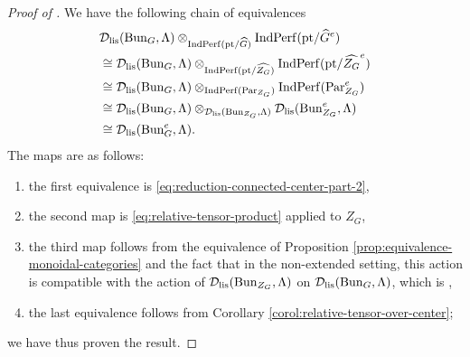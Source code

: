 \begin{proof}[Proof of ]
    We have the following chain of equivalences 
    \begin{align*}
        &\mathcal{D}_{\textnormal{lis}}(\mathrm{Bun}_{G},\Lambda) \otimes_{\mathrm{Ind}\mathrm{Perf}(\mathrm{pt}/\widehat{G})} \mathrm{Ind}\mathrm{Perf}(\mathrm{pt}/\widehat{G}^e) \\
        &\cong \mathcal{D}_{\textnormal{lis}}(\mathrm{Bun}_{G},\Lambda) \otimes_{\mathrm{Ind}\mathrm{Perf}(\mathrm{pt}/\widehat{Z_G})} \mathrm{Ind}\mathrm{Perf}(\mathrm{pt}/\widehat{Z_G}^e) \\
        &\cong \mathcal{D}_{\textnormal{lis}}(\mathrm{Bun}_{G},\Lambda) \otimes_{\mathrm{Ind}\mathrm{Perf}(\mathrm{Par}_{Z_G})} \mathrm{Ind}\mathrm{Perf}(\mathrm{Par}_{Z_G}^e) \\
        &\cong \mathcal{D}_{\textnormal{lis}}(\mathrm{Bun}_{G},\Lambda) \otimes_{\mathcal{D}_{\textnormal{lis}}(\mathrm{Bun}_{Z_G},\Lambda)} \mathcal{D}_{\textnormal{lis}}(\mathrm{Bun}_{Z_G}^e,\Lambda) \\
        &\cong \mathcal{D}_{\textnormal{lis}}(\mathrm{Bun}_{G}^e,\Lambda).
    \end{align*}
    The maps are as follows:
    \begin{enumerate}
        \item the first equivalence is \eqref{eq:reduction-connected-center-part-2},
        \item the second map is \eqref{eq:relative-tensor-product} applied to $Z_G$, 
        \item the third map follows from the equivalence of Proposition \ref{prop:equivalence-monoidal-categories} and the fact that in the non-extended setting, this action is compatible with the action of $\mathcal{D}_{\textnormal{lis}}(\mathrm{Bun}_{Z_{G}},\Lambda)$ on $\mathcal{D}_{\textnormal{lis}}(\mathrm{Bun}_{G},\Lambda)$, which is \cite[Theorem 4.1]{Zou26}, 
        \item the last equivalence follows from Corollary \ref{corol:relative-tensor-over-center};
    \end{enumerate}
    we have thus proven the result.
\end{proof}
